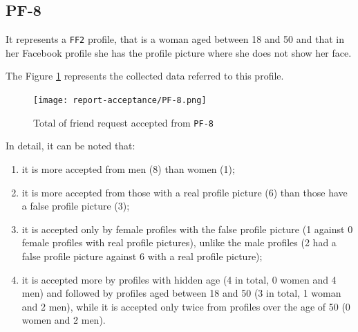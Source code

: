\subsection*{PF-8}
It represents a \texttt{FF2} profile, that is a woman aged between 18 and 50 and that in her Facebook profile she has the profile picture where she does not show her face.
\par \noindent The Figure \ref{fig:accepted-from-PF8} represents the collected data referred to this profile.
\begin{figure}[H]	
	\centering
	\texttt{[image: report-acceptance/PF-8.png]} 
	\caption{Total of friend request accepted from \texttt{PF-8}}
	\label{fig:accepted-from-PF8}
\end{figure}
\par \noindent In detail, it can be noted that:
\begin{enumerate}		
	\item it is more accepted from men (8) than women (1);
	\item it is more accepted from those with a real profile picture (6) than those have a false profile picture (3);
	\item it is accepted only by female profiles with the false profile picture (1 against 0 female profiles with real profile pictures), unlike the male profiles (2 had a false profile picture against 6 with a real profile picture);
	\item it is accepted more by profiles with hidden age (4 in total, 0 women and 4 men) and followed by profiles aged between 18 and 50 (3 in total, 1 woman and 2 men), while it is accepted only twice from profiles over the age of 50 (0 women and 2 men).
\end{enumerate}


